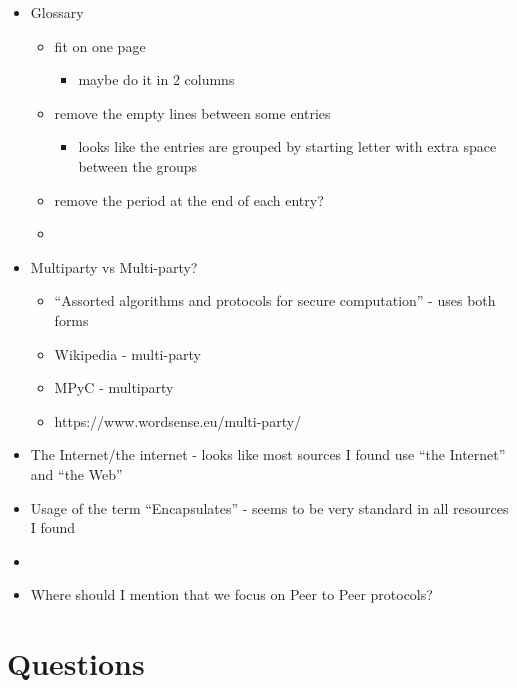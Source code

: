 \begin{itemize}
\tightlist
\item
  Glossary

  \begin{itemize}
  \tightlist
  \item
    fit on one page

    \begin{itemize}
    \tightlist
    \item
      maybe do it in 2 columns
    \end{itemize}
  \item
    remove the empty lines between some entries

    \begin{itemize}
    \tightlist
    \item
      looks like the entries are grouped by starting letter with extra space between the groups
    \end{itemize}
  \item
    remove the period at the end of each entry?
  \item
  \end{itemize}
\item
  Multiparty vs Multi-party?

  \begin{itemize}
  \tightlist
  \item
    ``Assorted algorithms and protocols for secure computation'' - uses both forms
  \item
    Wikipedia - multi-party
  \item
    MPyC - multiparty
  \item
    https://www.wordsense.eu/multi-party/
  \end{itemize}
\item
  The Internet/the internet - looks like most sources I found use ``the Internet'' and ``the Web''
\item
  Usage of the term ``Encapsulates'' - seems to be very standard in all resources I found
\item
\item
  Where should I mention that we focus on Peer to Peer protocols?
\end{itemize}

\label{notes__09000-questions.md}
\chapter{Questions}\label{notes__09000-questions.md__questions}

